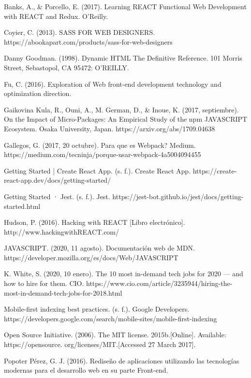 \begin{thebibliography}{100} 

 Banks, A., & Porcello, E. (2017). Learning REACT Functional Web Development with REACT and Redux. O’Reilly.

 Coyier, C. (2013). SASS FOR WEB DESIGNERS. https://abookapart.com/products/sass-for-web-designers

 Danny Goodman. (1998). Dynamic HTML The Definitive Reference. 101 Morris Street, Sebastopol, CA 95472: O'REILLY.

 Fu, C. (2016). Exploration of Web front-end development technology and optimization direction.

\bibitem{} Gaikovina Kula, R., Ouni, A., M. German, D., & Inoue, K. (2017, septiembre). On the Impact of Micro-Packages: An Empirical Study of the npm JAVASCRIPT Ecosystem. Osaka University, Japan. https://arxiv.org/abs/1709.04638

 Gallegos, G. (2017, 20 octubre). Para que es Webpack? Medium. https://medium.com/tecninja/porque-usar-webpack-4a5004094455

 Getting Started | Create React App. (s. f.). Create React App. https://create-react-app.dev/docs/getting-started/

 Getting Started · Jest. (s. f.). Jest. https://jest-bot.github.io/jest/docs/getting-started.html

\bibitem{} Hudson, P. (2016). Hacking with REACT [Libro electrónico]. http://www.hackingwithREACT.com/

 JAVASCRIPT. (2020, 11 agosto). Documentación web de MDN. https://developer.mozilla.org/es/docs/Web/JAVASCRIPT

\bibitem{} K. White, S. (2020, 10 enero). The 10 most in-demand tech jobs for 2020 — and how to hire for them. CIO. https://www.cio.com/article/3235944/hiring-the-most-in-demand-tech-jobs-for-2018.html

 Mobile-first indexing best practices. (s. f.). Google Developers. https://developers.google.com/search/mobile-sites/mobile-first-indexing


\bibitem{} Open Source Initiative. (2006). The MIT license. 2015b.[Online]. Available: https://opensource. org/licenses/MIT.[Accessed 27 March 2017].


 Popoter Pérez, G. J. (2016). Rediseño de aplicaciones utilizando las tecnologías modernas para el desarrollo web en su parte Front-end.



\end{thebibliography}
